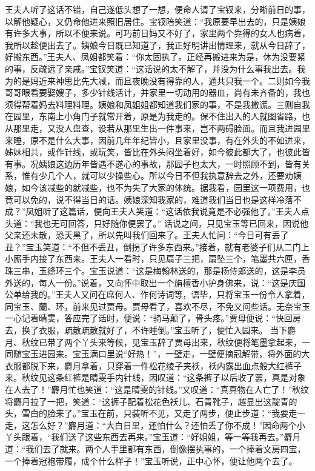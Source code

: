 \documentclass[12pt,oneside]{book}
\begin{document}
王夫人听了这话不错，自己遂低头想了一想，便命人请了宝钗来，分晰前日的事，以解他疑心，又仍命他进来照旧居住。宝钗陪笑道：“我原要早出去的，只是姨娘有许多大事，所以不便来说。可巧前日妈又不好了，家里两个靠得的女人也病着，我所以趁便出去了。姨娘今日既已知道了，我正好明讲出情理来，就从今日辞了，好搬东西。”王夫人、凤姐都笑着：“你太固执了。正经再搬进来为是，休为没要紧的事，反疏远了亲戚。”宝钗笑道：“这话说的太不解了，并没为什么事我出去。我为的是妈近来神思比先大减，而且夜晚没有得靠的人，通共只我一个。二则如今我哥哥眼看要娶嫂子，多少针线活计，并家里一切动用的器皿，尚有未齐备的，我也须得帮着妈去料理料理。姨娘和凤姐姐都知道我们家的事，不是我撒谎。三则自我在园里，东南上小角门子就常开着，原是为我走的。保不住出入的人就图省路，也从那里走，又没人盘查，设若从那里生出一件事来，岂不两碍脸面。而且我进园里来睡，原不是什么大事，因前几年年纪皆小，且家里没事，有在外头的不如进来，姊妹相共，或作针线，或玩笑，皆比在外头闷坐着好，如今彼此都大了，也彼此皆有事。况姨娘这边历年皆遇不遂心的事故，那园子也太大，一时照顾不到，皆有关系，惟有少几个人，就可以少操些心。所以今日不但我执意辞去之外，还要劝姨娘，如今该减些的就减些，也不为失了大家的体统。据我看，园里这一项费用，也竟可以免的，说不得当日的话。姨娘深知我家的，难道我们当日也是这样冷落不成？”凤姐听了这篇话，便向王夫人笑道：“这话依我说竟是不必强他了。”王夫人点头道：“我也无可回答，只好随你便罢了。”
话说之间，只见宝玉等已回来，因说他父亲还未散，恐天黑了，所以先叫我们回来了。王夫人忙问：“今日可有丢了丑？”宝玉笑道：“不但不丢丑，倒拐了许多东西来。”接着，就有老婆子们从二门上小厮手内接了东西来。王夫人一看时，只见扇子三把，扇坠三个，笔墨共六匣，香珠三串，玉绦环三个。宝玉说道：“这是梅翰林送的，那是杨侍郎送的，这是李员外送的，每人一份。”说着，又向怀中取出一个旃檀香小护身佛来，说：“这是庆国公单给我的。”王夫人又问在席何人、作何诗词等，语毕，只将宝玉一份令人拿着，同宝玉、蘭、环，前来见过贾母。贾母看了，喜欢不尽，不免又问些话。无奈宝玉一心记着晴雯，答应完了话时，便说：“骑马颠了，骨头疼。”贾母便说：“快回房去，换了衣服，疏散疏散就好了，不许睡倒。”宝玉听了，便忙入园来。
当下麝月、秋纹已带了两个丫头来等候，见宝玉辞了贾母出来，秋纹便将笔墨拿起来，一同随宝玉进园来。宝玉满口里说“好热！”，一壁走，一壁便摘冠解带，将外面的大衣服都脱下来，麝月拿着，只穿着一件松花绫子夹袄，袄内露出血点般大红裤子来。秋纹见这条红裤是晴雯手内针线，因叹道：“这条裤子以后收了罢，真是对象在人去了！”麝月忙也笑道：“这是晴雯的针线。”又叹道：“真真物在人亡了！”秋纹将麝月拉了一把，笑道：“这裤子配着松花色袄儿、石青靴子，越显出这靛青的头，雪白的脸来了。”宝玉在前，只装听不见，又走了两步，便止步道：“我要走一走，这怎么好？”麝月道：“大白日里，还怕什么？还怕丢了你不成！”因命两个小丫头跟着，“我们送了这些东西去再来。”宝玉道：“好姐姐，等一等我再去。”麝月道：“我们去了就来。两个人手里都有东西，倒像摆执事的，一个捧着文房四宝，一个捧着冠袍带履，成个什么样子！”宝玉听说，正中心怀，便让他两个去了。
\end{document}
